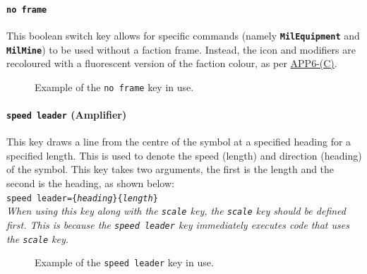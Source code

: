 \documentclass[a4paper, titlepage]{article}
\newcommand\DocLink{\href{https://www.awl.edu.pl/images/en/APP_6_C.pdf}{APP6-(C)}}
\begin{document}
\paragraph{\texttt{no frame}}

This boolean switch key allows for specific commands (namely \textbf{\texttt{MilEquipment}} and \textbf{\texttt{MilMine}}) to be used without a faction frame. Instead, the icon and modifiers are recoloured with a fluorescent version of the faction colour, as per \DocLink.

\begin{figure}[H]
\centering
{}
\caption{Example of the \texttt{no frame} key in use.}
\end{figure}

\paragraph{\texttt{speed leader} (Amplifier)}

This key draws a line from the centre of the symbol at a specified heading for a specified length. This is used to denote the speed (length) and direction (heading) of the symbol. This key takes two arguments, the first is the length and the second is the heading, as shown below:\\

\texttt{speed leader=\{\textit{heading}\}\{\textit{length}\}}\\

\textit{When using this key along with the \texttt{scale} key, the \texttt{scale} key should be defined first. This is because the \texttt{speed leader} key immediately executes code that uses the \texttt{scale} key.}

\begin{figure}[H]
\centering
{}
\caption{Example of the \texttt{speed leader} key in use.}
\end{figure}
\end{document}
